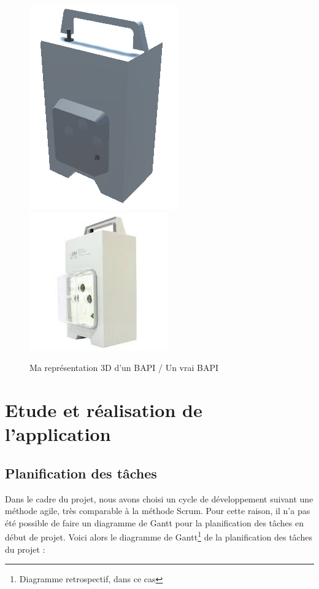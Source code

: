\documentclass[a4paper]{article}
\begin{document}
    \begin{figure}[H]
        \centering
        \includegraphics[scale=0.5]{img/BAPI-Screen}
        \includegraphics[scale=0.5]{img/BAPI-Reel}
        \caption{Ma représentation 3D d'un BAPI / Un vrai BAPI}
    \end{figure}

    \section{Etude et réalisation de l'application}

    \subsection{Planification des tâches}
    
     Dans le cadre du projet, nous avons choisi un cycle de développement suivant une méthode agile, très comparable à la méthode Scrum. Pour cette raison, il n'a pas été possible de faire un diagramme de Gantt pour la planification des tâches en début de projet. Voici alors le diagramme de Gantt\footnote{Diagramme retrospectif, dans ce cas} de la planification des tâches du projet :
\end{document}
